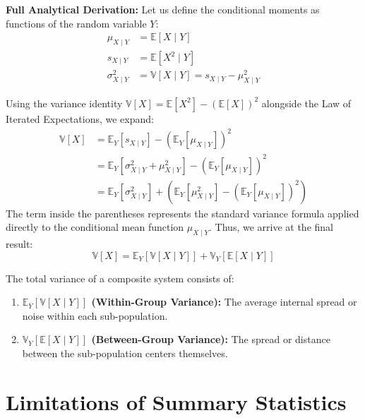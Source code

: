 \documentclass{article}
\begin{document}
\noindent \textbf{Full Analytical Derivation:}
Let us define the conditional moments as functions of the random variable $Y$:
\begin{align*}
    \mu_{X \mid Y} &= \mathbb{E}[X \mid Y] \\
    s_{X \mid Y} &= \mathbb{E}[X^2 \mid Y] \\
    \sigma^2_{X \mid Y} &= \mathbb{V}[X \mid Y] = s_{X \mid Y} - \mu^2_{X \mid Y}
\end{align*}

Using the variance identity $\mathbb{V}[X] = \mathbb{E}[X^2] - (\mathbb{E}[X])^2$ alongside the Law of Iterated Expectations, we expand:
\begin{align}
    \mathbb{V}[X] &= \mathbb{E}_Y\left[s_{X \mid Y}\right] - \left(\mathbb{E}_Y\left[\mu_{X \mid Y}\right]\right)^2 \\
    &= \mathbb{E}_Y\left[\sigma^2_{X \mid Y} + \mu^2_{X \mid Y}\right] - \left(\mathbb{E}_Y\left[\mu_{X \mid Y}\right]\right)^2 \\
    &= \mathbb{E}_Y\left[\sigma^2_{X \mid Y}\right] + \left( \mathbb{E}_Y\left[\mu^2_{X \mid Y}\right] - \left(\mathbb{E}_Y\left[\mu_{X \mid Y}\right]\right)^2 \right)
\end{align}
The term inside the parentheses represents the standard variance formula applied directly to the conditional mean function $\mu_{X \mid Y}$. Thus, we arrive at the final result:
\begin{equation}
    \mathbb{V}[X] = \mathbb{E}_Y\left[\mathbb{V}[X \mid Y]\right] + \mathbb{V}_Y\left[\mathbb{E}[X \mid Y]\right]
\end{equation}

\begin{tcolorbox}[colback=blue!5!white, colframe=blue!60!black, title=Physical Interpretation]
The total variance of a composite system consists of:
\begin{enumerate}
    \item \textbf{$\mathbb{E}_Y[\mathbb{V}[X \mid Y]]$ (Within-Group Variance):} The average internal spread or noise within each sub-population.
    \item \textbf{$\mathbb{V}_Y[\mathbb{E}[X \mid Y]]$ (Between-Group Variance):} The spread or distance between the sub-population centers themselves.
\end{enumerate}
\end{tcolorbox}

\section*{Limitations of Summary Statistics}
\end{document}
